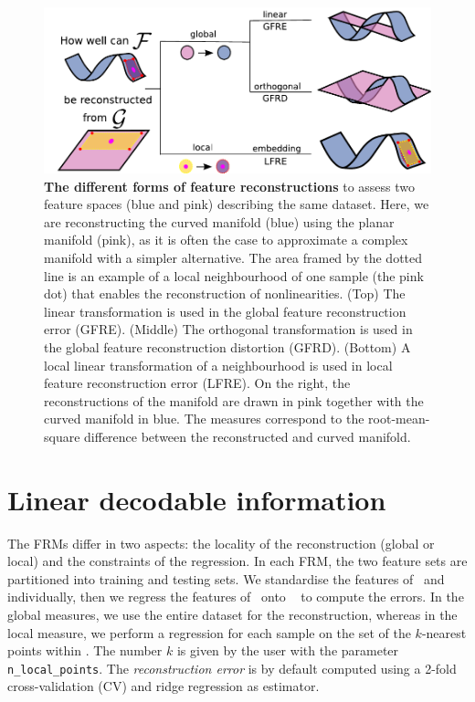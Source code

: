 \begin{figure}
\includegraphics[width=\linewidth]{fig/frm.pdf}
\caption{\textbf{The different forms of feature reconstructions}
to assess two feature spaces (blue and pink) describing the same dataset. Here, we are reconstructing the curved manifold (blue) using the planar manifold (pink), as it is often the case to approximate a complex manifold with a simpler alternative. The area framed by the dotted line is an example of a local neighbourhood of one sample (the pink dot) that enables the reconstruction of nonlinearities. (Top) The linear transformation is used in the global feature reconstruction error (GFRE). (Middle) The orthogonal transformation is used in the global feature reconstruction distortion (GFRD). (Bottom) A local linear transformation of a neighbourhood is used in local feature reconstruction error (LFRE). On the right, the reconstructions of the manifold are drawn in pink together with the curved manifold in blue. The measures correspond to the root-mean-square difference between the reconstructed and curved manifold.
}\label{fig:frm}
\end{figure}


\section{Linear decodable information}
The FRMs differ in two aspects: the locality of the reconstruction (global or local) and the constraints of the regression. In each FRM, the two feature sets are partitioned into training and testing sets. We standardise the features of \Fone~and \Ftwo~ individually, then we regress the features of \Fone~onto \Ftwo~ to compute the errors. In the global measures, we use the entire dataset for the reconstruction, whereas in the local measure, we perform a regression for each sample on the set of the $k$-nearest points within \Fone. The number $k$ is given by the user with the parameter \texttt{n\_local\_points}. The \emph{reconstruction error} is by default computed using a 2-fold cross-validation (CV) and ridge regression as estimator. 

